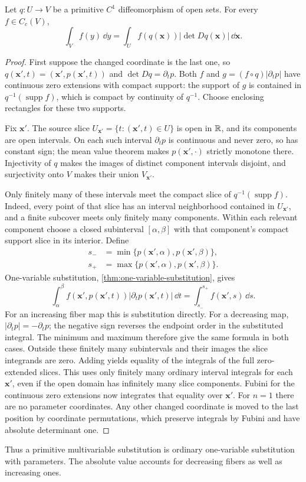 \begin{lemma}\label{lem:primitive-substitution}
Let $q:U\to V$ be a primitive $C^1$ diffeomorphism of open sets.
For every $f\in C_c(V)$,
\[
\int_V f(y)\,\dd y=\int_U f(q(\mathbf{x}))|\det Dq(\mathbf{x})|\,\dd\mathbf{x}.
\]
\end{lemma}
\begin{proof}
First suppose the changed coordinate is the last one, so
$q(\mathbf{x}',t)=(\mathbf{x}',p(\mathbf{x}',t))$ and $\det Dq=\partial_t p$.
Both $f$ and $g=(f\circ q)|\partial_t p|$ have continuous zero
extensions with compact support: the support of $g$ is contained in
$q^{-1}(\operatorname{supp}f)$, which is compact by continuity of $q^{-1}$.
Choose enclosing rectangles for these two supports.

Fix $\mathbf{x}'$. The source slice $U_{\mathbf{x}'}=\{t:(\mathbf{x}',t)\in U\}$ is open in
$\mathbb{R}$, and its components are open intervals. On each such interval
$\partial_t p$ is continuous and never zero, so has constant sign;
the mean value theorem makes $p(\mathbf{x}',\cdot)$ strictly monotone there.
Injectivity of $q$ makes the images of distinct component intervals
disjoint, and surjectivity onto $V$ makes their union $V_{\mathbf{x}'}$.

Only finitely many of these intervals meet the compact slice of
$q^{-1}(\operatorname{supp}f)$. Indeed, every point of that slice has
an interval neighborhood contained in $U_{\mathbf{x}'}$, and a finite subcover
meets only finitely many components. Within each relevant component
choose a closed subinterval $[\alpha,\beta]$ with that component's
compact support slice in its interior. Define
\[
\begin{aligned}
s_-&=\min\{p(\mathbf{x}',\alpha),p(\mathbf{x}',\beta)\},\\
s_+&=\max\{p(\mathbf{x}',\alpha),p(\mathbf{x}',\beta)\}.
\end{aligned}
\]
One-variable substitution, \cref{thm:one-variable-substitution}, gives
\[
\int_\alpha^\beta f(\mathbf{x}',p(\mathbf{x}',t))|\partial_t p(\mathbf{x}',t)|\,\dd t
=\int_{s_-}^{s_+}f(\mathbf{x}',s)\,\dd s.
\]
For an increasing fiber map this is substitution directly. For a
decreasing map, $|\partial_t p|=-\partial_t p$; the negative sign
reverses the endpoint order in the substituted integral. The minimum
and maximum therefore give the same formula in both cases.
Outside these finitely many subintervals and their images the slice
integrands are zero.
Adding yields equality of the integrals of the full zero-extended slices.
This uses only finitely many ordinary interval integrals for each $\mathbf{x}'$,
even if the open domain has infinitely many slice components.
Fubini for the continuous zero extensions now integrates that equality
over $\mathbf{x}'$. For $n=1$ there are no parameter coordinates. Any other
changed coordinate is moved to the last position by coordinate
permutations, which preserve integrals by Fubini and have absolute
determinant one.
\end{proof}
Thus a primitive multivariable substitution is ordinary one-variable
substitution with parameters. The absolute value accounts for decreasing
fibers as well as increasing ones.

